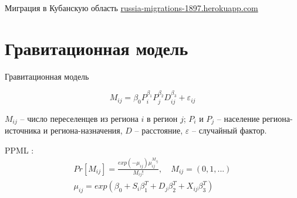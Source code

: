 \documentclass[aspectratio=169]{beamer}
\begin{document}
{
\begin{frame}[b]{Миграция в Кубанскую область}
\hfill \href{https://russia-migrations-1897.herokuapp.com}{russia-migrations-1897.herokuapp.com}
\bigskip
\end{frame}
}

\section{Гравитационная модель}
\begin{frame}{Гравитационная модель}

\begin{equation*}
	M_{ij} = \beta_0 P^{\beta_1}_{i} P^{\beta_2}_{j} D^{\beta_3}_{ij} + \varepsilon_{ij}
\end{equation*}

$M_{ij}$ – число переселенцев из региона $i$ в регион $j$; $P_i$ и $P_j$ -- население региона-источника и региона-назначения, $D$ -- расстояние, $\varepsilon$ -- случайный фактор.

PPML \citep{silva_log_2006}:
\begin{gather*}
	Pr[M_{ij}] = \frac{exp(-\mu_{ij})\mu^{M_{ij}}_{ij}}{M_{ij}!},\quad M_{ij} = (0, 1, ...) \\
	\mu_{ij} = exp(\beta_0 + S_i \beta_1^T + D_{j} \beta_2^T + X_{ij} \beta_3^T)
\end{gather*}

\end{frame}
\end{document}
